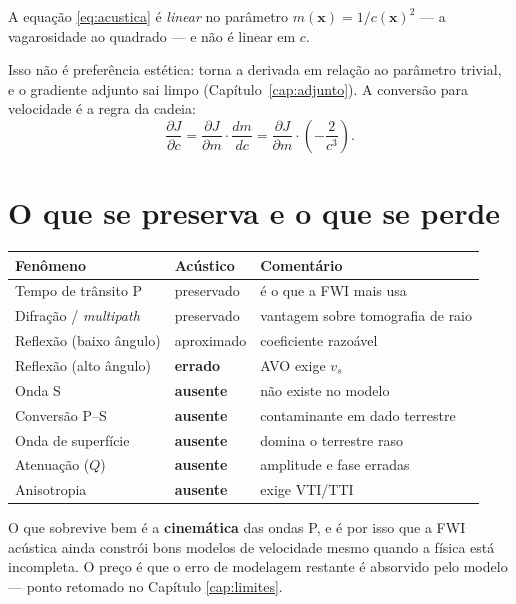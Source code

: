 \documentclass[11pt,a4paper,oneside]{report}
\begin{document}
\begin{teoria}[Por que invertemos em $m = 1/c^2$, e não em $c$]
A equação \eqref{eq:acustica} é \emph{linear} no parâmetro
$m(\mathbf{x}) = 1/c(\mathbf{x})^{2}$ --- a vagarosidade ao quadrado --- e
não é linear em $c$.

Isso não é preferência estética: torna a derivada em relação ao parâmetro
trivial, e o gradiente adjunto sai limpo (Capítulo~\ref{cap:adjunto}). A conversão para
velocidade é a regra da cadeia:
\[
\frac{\partial J}{\partial c} = \frac{\partial J}{\partial m}\cdot\frac{dm}{dc}
= \frac{\partial J}{\partial m}\cdot\left(-\frac{2}{c^{3}}\right).
\]
\end{teoria}

\section{O que se preserva e o que se perde}

\begin{center}
\begin{tabular}{@{}lll@{}}
\toprule
\textbf{Fenômeno} & \textbf{Acústico} & \textbf{Comentário} \\
\midrule
Tempo de trânsito P      & preservado & é o que a FWI mais usa \\
Difração / \emph{multipath} & preservado & vantagem sobre tomografia de raio \\
Reflexão (baixo ângulo)  & aproximado & coeficiente razoável \\
Reflexão (alto ângulo)   & \textbf{errado} & AVO exige $v_s$ \\
Onda S                   & \textbf{ausente} & não existe no modelo \\
Conversão P--S           & \textbf{ausente} & contaminante em dado terrestre \\
Onda de superfície       & \textbf{ausente} & domina o terrestre raso \\
Atenuação ($Q$)          & \textbf{ausente} & amplitude e fase erradas \\
Anisotropia              & \textbf{ausente} & exige VTI/TTI \\
\bottomrule
\end{tabular}
\end{center}

O que sobrevive bem é a \textbf{cinemática} das ondas P, e é por isso que a
FWI acústica ainda constrói bons modelos de velocidade mesmo quando a física
está incompleta. O preço é que o erro de modelagem restante é absorvido pelo
modelo --- ponto retomado no Capítulo \ref{cap:limites}.
\end{document}
